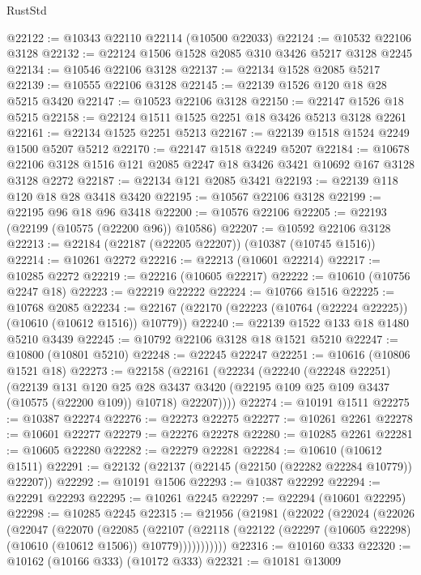 \begin{lexlean}{RustStd}
\begin{coremodule}
@22122 := @10343 @22110 @22114 (@10500 @22033)
@22124 := @10532 @22106 @3128
@22132 := @22124 @1506 @1528 @2085 @310 @3426 @5217 @3128 @2245
@22134 := @10546 @22106 @3128
@22137 := @22134 @1528 @2085 @5217
@22139 := @10555 @22106 @3128
@22145 := @22139 @1526 @120 @18 @28 @5215 @3420
@22147 := @10523 @22106 @3128
@22150 := @22147 @1526 @18 @5215
@22158 := @22124 @1511 @1525 @2251 @18 @3426 @5213 @3128 @2261
@22161 := @22134 @1525 @2251 @5213
@22167 := @22139 @1518 @1524 @2249 @1500 @5207 @5212
@22170 := @22147 @1518 @2249 @5207
@22184 := @10678 @22106 @3128 @1516 @121 @2085 @2247 @18 @3426 @3421 @10692 @167 @3128 @3128 @2272
@22187 := @22134 @121 @2085 @3421
@22193 := @22139 @118 @120 @18 @28 @3418 @3420
@22195 := @10567 @22106 @3128
@22199 := @22195 @96 @18 @96 @3418
@22200 := @10576 @22106
@22205 := @22193 (@22199 (@10575 (@22200 @96)) @10586)
@22207 := @10592 @22106 @3128
@22213 := @22184 (@22187 (@22205 @22207)) (@10387 (@10745 @1516))
@22214 := @10261 @2272
@22216 := @22213 (@10601 @22214)
@22217 := @10285 @2272
@22219 := @22216 (@10605 @22217)
@22222 := @10610 (@10756 @2247 @18)
@22223 := @22219 @22222
@22224 := @10766 @1516
@22225 := @10768 @2085
@22234 := @22167 (@22170 (@22223 (@10764 (@22224 @22225)) (@10610 (@10612 @1516)) @10779))
@22240 := @22139 @1522 @133 @18 @1480 @5210 @3439
@22245 := @10792 @22106 @3128 @18 @1521 @5210
@22247 := @10800 (@10801 @5210)
@22248 := @22245 @22247
@22251 := @10616 (@10806 @1521 @18)
@22273 := @22158
    (@22161
      (@22234
        (@22240
          (@22248 @22251)
          (@22139
            @131
            @120
            @25
            @28
            @3437
            @3420
            (@22195 @109 @25 @109 @3437 (@10575 (@22200 @109)) @10718)
            @22207))))
@22274 := @10191 @1511
@22275 := @10387 @22274
@22276 := @22273 @22275
@22277 := @10261 @2261
@22278 := @10601 @22277
@22279 := @22276 @22278
@22280 := @10285 @2261
@22281 := @10605 @22280
@22282 := @22279 @22281
@22284 := @10610 (@10612 @1511)
@22291 := @22132 (@22137 (@22145 (@22150 (@22282 @22284 @10779)) @22207))
@22292 := @10191 @1506
@22293 := @10387 @22292
@22294 := @22291 @22293
@22295 := @10261 @2245
@22297 := @22294 (@10601 @22295)
@22298 := @10285 @2245
@22315 := @21956
    (@21981
      (@22022
        (@22024
          (@22026
            (@22047
              (@22070
                (@22085
                  (@22107
                    (@22118
                      (@22122 (@22297 (@10605 @22298) (@10610 (@10612 @1506)) @10779)))))))))))
@22316 := @10160 @333
@22320 := @10162 (@10166 @333) (@10172 @333)
@22321 := @10181 @13009

\end{coremodule}
\end{lexlean}
